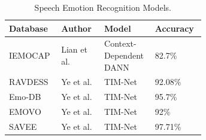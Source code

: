     \begin{table}[ht]
        \centering
        \begin{tabular}{|p{0.15\linewidth}|p{0.2\linewidth}|p{0.15\linewidth}|p{0.15\linewidth}|}
        \hline
        Database & Author & Model & Accuracy\\\hline
        
        IEMOCAP
        & Lian et al. \cite{lian-2020}
        & Context-Dependent DANN
        & 82.7\%\\\hline
        
        RAVDESS
        & Ye et al. \cite{ye_temporal_2022}
        & TIM-Net
        & 92.08\%\\\hline
        
        Emo-DB
        & Ye et al. \cite{ye_temporal_2022}
        & TIM-Net
        & 95.7\%\\\hline
        
        EMOVO
        & Ye et al. \cite{ye_temporal_2022}
        & TIM-Net
        & 92\%\\\hline

        SAVEE
        & Ye et al. \cite{ye_temporal_2022}
        & TIM-Net
        & 97.71\%\\\hline
        
        \end{tabular}
        \caption{\label{tab:speech}Speech Emotion Recognition Models.}
    \end{table}
